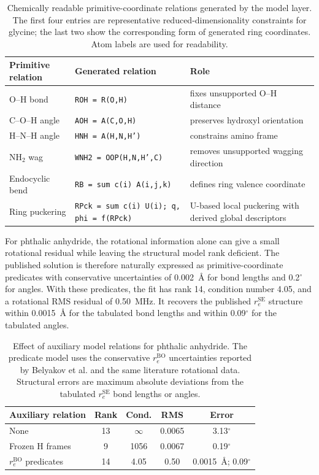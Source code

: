 \documentclass[aip,jcp,reprint,longbibliography,floatfix]{revtex4-2}
\begin{document}
\begin{table}[t]
\caption{Chemically readable primitive-coordinate relations generated by the
model layer. The first four entries are representative reduced-dimensionality
constraints for glycine; the last two show the corresponding form of generated
ring coordinates. Atom labels are used for readability.}
\label{tab:generated-relation-example}
\scriptsize
\setlength{\tabcolsep}{4pt}
\begin{tabular}{@{}lll@{}}
\toprule
Primitive relation & Generated relation & Role \\
\midrule
O--H bond & \texttt{ROH = R(O,H)} & fixes unsupported O--H distance \\
C--O--H angle & \texttt{AOH = A(C,O,H)} & preserves hydroxyl orientation \\
H--N--H angle & \texttt{HNH = A(H,N,H')} & constrains amino frame \\
NH$_2$ wag & \texttt{WNH2 = OOP(H,N,H',C)} & removes unsupported wagging direction \\
Endocyclic bend & \texttt{RB = sum c(i) A(i,j,k)} & defines ring valence coordinate \\
Ring puckering & \texttt{RPck = sum c(i) U(i); q, phi = f(RPck)} & U-based local puckering with derived global descriptors \\
\bottomrule
\end{tabular}
\end{table}

For phthalic anhydride, the rotational information alone can give a small
rotational residual while leaving the structural model rank deficient. The
published solution is therefore naturally expressed as primitive-coordinate
predicates with conservative uncertainties of 0.002~\AA{} for bond lengths and
0.2$^\circ$ for angles. With these predicates, the fit has
rank 14, condition number 4.05, and a rotational RMS residual of 0.50~MHz. It
recovers the published $r_e^\mathrm{SE}$ structure within 0.0015~\AA{} for the
tabulated bond lengths and within 0.09$^\circ$ for the tabulated angles.

\begin{table}[t]
\caption{Effect of auxiliary model relations for phthalic anhydride. The
predicate model uses the conservative $r_e^\mathrm{BO}$ uncertainties reported
by Belyakov et al. and the same literature rotational data. Structural errors are
maximum absolute deviations from the tabulated $r_e^\mathrm{SE}$ bond lengths or angles.}
\label{tab:phthalic-predicates}
\scriptsize
\setlength{\tabcolsep}{2.5pt}
\begin{tabular}{lcccc}
\toprule
Auxiliary relation & Rank & Cond. & RMS & Error \\
\midrule
None & 13 & $\infty$ & 0.0065 & 3.13$^\circ$ \\
Frozen H frames & 9 & 1056 & 0.0067 & 0.19$^\circ$ \\
$r_e^\mathrm{BO}$ predicates & 14 & 4.05 & 0.50 & 0.0015~\AA; 0.09$^\circ$ \\
\bottomrule
\end{tabular}
\end{table}
\end{document}
